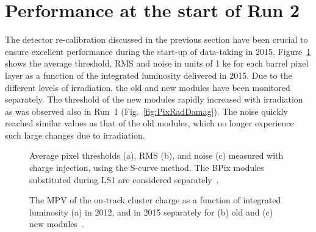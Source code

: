
\section{Performance at the start of Run 2}\label{sec:BPixPerf2015}

The detector re-calibration discussed in the previous section have been crucial to ensure excellent performance during the start-up of data-taking in 2015.
Figure~\ref{fig:ThrVsLumi2015} shows the average threshold, RMS and noise in units of 1 ke for each barrel pixel layer as a function of the integrated luminosity delivered in 2015.
Due to the different levels of irradiation, the old and new modules have been monitored separately.
The threshold of the new modules rapidly increased with irradiation as was observed also in Run~1 (Fig.~\ref{fig:PixRadDamag}).
The noise quickly reached similar values as that of the old modules, which no longer experience such large changes due to irradiation.

\begin{figure}[!htb]
 \begin{center}
 \end{center}
 \caption{Average pixel thresholds (a), RMS (b), and noise (c) measured with charge injection, using the S-curve method. The BPix modules substituted during LS1 are considered separately~\cite{PixelOffline}.}
 \label{fig:ThrVsLumi2015}
\end{figure}

\begin{figure}[!htb]
 \begin{center}
 \end{center}
 \caption{The MPV of the on-track cluster charge as a function of integrated luminosity (a) in 2012, and in 2015 separately for (b) old and (c) new modules~\cite{PixelOffline}.}
 \label{fig:ClusterChargeVsLumi}
\end{figure}

